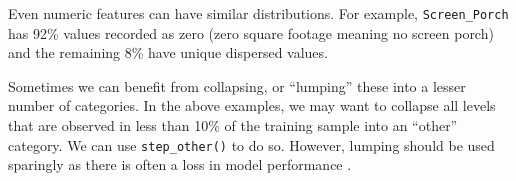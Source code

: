 \documentclass[]{krantz}
\makeatletter
\newenvironment{Shaded}{\begin{snugshade}}{\end{snugshade}}
\newcommand{\CommentTok}[1]{\textcolor[rgb]{0.37,0.37,0.37}{\textit{#1}}}
\newcommand{\KeywordTok}[1]{\textcolor[rgb]{0.27,0.27,0.27}{\textbf{#1}}}
\newcommand{\NormalTok}[1]{#1}
\newcommand{\OperatorTok}[1]{\textcolor[rgb]{0.43,0.43,0.43}{\textbf{#1}}}
\newcommand{\StringTok}[1]{\textcolor[rgb]{0.5,0.5,0.5}{#1}}
\newenvironment{kframe}{%
\medskip{}
\setlength{\fboxsep}{.8em}
 \def\at@end@of@kframe{}%
 \ifinner\ifhmode%
  \def\at@end@of@kframe{\end{minipage}}%
  \begin{minipage}{\columnwidth}%
 \fi\fi%
 \def\FrameCommand##1{\hskip\@totalleftmargin \hskip-\fboxsep
 \colorbox{shadecolor}{##1}\hskip-\fboxsep
     \hskip-\linewidth \hskip-\@totalleftmargin \hskip\columnwidth}%
 \MakeFramed {\advance\hsize-\width
   \@totalleftmargin\z@ \linewidth\hsize
   \@setminipage}}%
 {\par\unskip\endMakeFramed%
 \at@end@of@kframe}
\renewenvironment{Shaded}{\begin{kframe}}{\end{kframe}}
\makeatother
\begin{document}
\begin{Shaded}
\end{Shaded}

Even numeric features can have similar distributions. For example, \texttt{Screen\_Porch} has 92\% values recorded as zero (zero square footage meaning no screen porch) and the remaining 8\% have unique dispersed values.

\begin{Shaded}
\end{Shaded}

Sometimes we can benefit from collapsing, or ``lumping'' these into a lesser number of categories. In the above examples, we may want to collapse all levels that are observed in less than 10\% of the training sample into an ``other'' category. We can use \texttt{step\_other()} to do so. However, lumping should be used sparingly as there is often a loss in model performance \citep{apm}.
\end{document}

